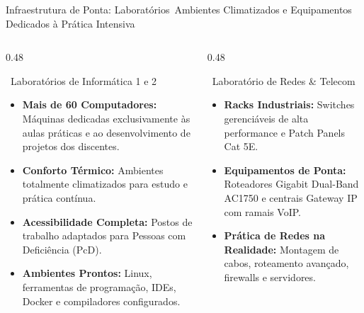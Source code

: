 
\begin{frame}{Infraestrutura de Ponta: Laboratórios}{\faMicrochip\ Ambientes Climatizados e Equipamentos Dedicados à Prática Intensiva}
  \begin{columns}[t]
    \begin{column}{0.48\textwidth}
      \begin{bluecard}{\faDesktop\ Laboratórios de Informática 1 e 2}
        \scriptsize
        \begin{itemize}\setlength{\itemsep}{0.22em}
          \item \textbf{Mais de 60 Computadores:} Máquinas dedicadas exclusivamente às aulas práticas e ao desenvolvimento de projetos dos discentes.
          \item \textbf{Conforto Térmico:} Ambientes totalmente climatizados para estudo e prática contínua.
          \item \textbf{Acessibilidade Completa:} Postos de trabalho adaptados para Pessoas com Deficiência (PcD).
          \item \textbf{Ambientes Prontos:} Linux, ferramentas de programação, IDEs, Docker e compiladores configurados.
        \end{itemize}
      \end{bluecard}
    \end{column}
    
    \begin{column}{0.48\textwidth}
      \begin{greencard}{\faNetworkWired\ Laboratório de Redes \& Telecom}
        \scriptsize
        \begin{itemize}\setlength{\itemsep}{0.18em}
          \item \textbf{Racks Industriais:} Switches gerenciáveis de alta performance e Patch Panels Cat 5E.
          \item \textbf{Equipamentos de Ponta:} Roteadores Gigabit Dual-Band AC1750 e centrais Gateway IP com ramais VoIP.
          \item \textbf{Prática de Redes na Realidade:} Montagem de cabos, roteamento avançado, firewalls e servidores.
        \end{itemize}
      \end{greencard}
    \end{column}
  \end{columns}
\end{frame}

